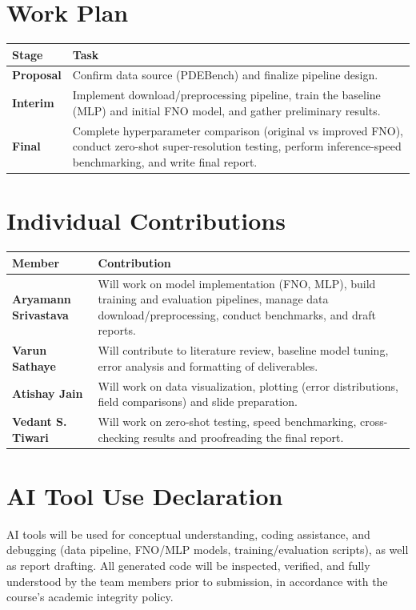 \documentclass[12pt, a4paper]{article}
\begin{document}
\section{Work Plan}

\begin{table}[h]
\centering
\begin{tabularx}{\textwidth}{@{} l X @{}}
\toprule
\textbf{Stage} & \textbf{Task} \\
\midrule
\textbf{Proposal} & Confirm data source (PDEBench) and finalize pipeline design. \\
\textbf{Interim} & Implement download/preprocessing pipeline, train the baseline (MLP) and initial FNO model, and gather preliminary results. \\
\textbf{Final} & Complete hyperparameter comparison (original vs improved FNO), conduct zero-shot super-resolution testing, perform inference-speed benchmarking, and write final report. \\
\bottomrule
\end{tabularx}
\end{table}

\section{Individual Contributions}

\begin{table}[h]
\centering
\begin{tabularx}{\textwidth}{@{} l X @{}}
\toprule
\textbf{Member} & \textbf{Contribution} \\
\midrule
\textbf{Aryamann Srivastava} & Will work on model implementation (FNO, MLP), build training and evaluation pipelines, manage data download/preprocessing, conduct benchmarks, and draft reports. \\
\addlinespace
\textbf{Varun Sathaye} & Will contribute to literature review, baseline model tuning, error analysis and formatting of deliverables. \\
\addlinespace
\textbf{Atishay Jain} & Will work on data visualization, plotting (error distributions, field comparisons) and slide preparation. \\
\addlinespace
\textbf{Vedant S. Tiwari} & Will work on zero-shot testing, speed benchmarking, cross-checking results and proofreading the final report. \\
\bottomrule
\end{tabularx}
\end{table}

\section{AI Tool Use Declaration}
AI tools will be used for conceptual understanding, coding assistance, and debugging (data pipeline, FNO/MLP models, training/evaluation scripts), as well as report drafting. All generated code will be inspected, verified, and fully understood by the team members prior to submission, in accordance with the course's academic integrity policy.
\end{document}
